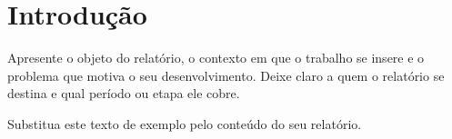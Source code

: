 \section{Introdução}

Apresente o objeto do relatório, o contexto em que o trabalho se insere e o
problema que motiva o seu desenvolvimento. Deixe claro a quem o relatório se
destina e qual período ou etapa ele cobre.

Substitua este texto de exemplo pelo conteúdo do seu relatório.

